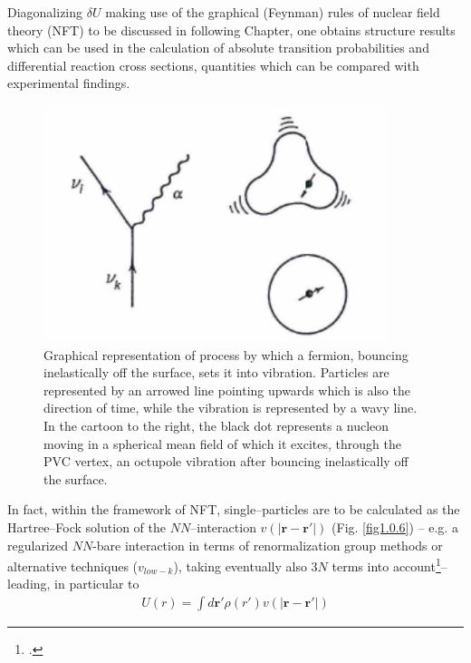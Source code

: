  Diagonalizing $\delta U$ making use of the graphical (Feynman) rules of nuclear field theory (NFT) to be discussed in following Chapter, one obtains structure results which can be used in the calculation of absolute transition probabilities and differential reaction cross sections, quantities which can be compared with experimental findings.

  \begin{figure}
  	\centerline {
  		\includegraphics*[width=10cm]{introduccion/figs/figpreface5}
  	}
  	\caption{Graphical representation of  process       by which a fermion, bouncing inelastically off the surface, sets it into vibration. Particles are represented by an arrowed line pointing upwards which is also the direction of time, while the vibration is represented by a wavy line. In the cartoon to the right, the black dot represents a nucleon moving in a spherical mean field of which it excites, through the PVC vertex, an octupole vibration after bouncing inelastically off the surface.}
  	\label{fig1.0.5}
  \end{figure}
In fact, within the framework of NFT, single--particles are to be calculated as the Hartree--Fock solution of the $NN$--interaction $v(|\mathbf r-\mathbf r'|)$ (Fig. \ref{fig1.0.6}) -- e.g. a regularized $NN$-bare interaction in terms of renormalization group methods or alternative techniques ($v_{low-k}$), taking eventually also 3$N$ terms into account\footnote{\cite{Schwenk}.}-- leading, in particular to
\begin{align}\label{eq1.0.18}
U(r)=\int d\mathbf r' \rho(r')v\left(|\mathbf r-\mathbf r'|\right)
\end{align}
